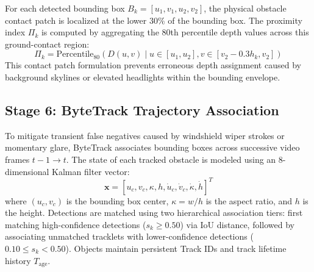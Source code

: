 \documentclass[conference]{IEEEtran}
\begin{document}
For each detected bounding box $B_k = [u_1, v_1, u_2, v_2]$, the physical obstacle contact patch is localized at the lower $30\%$ of the bounding box. The proximity index $\Pi_k$ is computed by aggregating the 80th percentile depth values across this ground-contact region:
\begin{equation}
\Pi_k = \text{Percentile}_{80} \left( D(u, v) \mid u \in [u_1, u_2], v \in [v_2 - 0.3h_k, v_2] \right)
\label{eq:proximity}
\end{equation}
This contact patch formulation prevents erroneous depth assignment caused by background skylines or elevated headlights within the bounding envelope.

\subsection{Stage 6: ByteTrack Trajectory Association}
To mitigate transient false negatives caused by windshield wiper strokes or momentary glare, ByteTrack associates bounding boxes across successive video frames $t-1 \to t$. The state of each tracked obstacle is modeled using an 8-dimensional Kalman filter vector:
\begin{equation}
\mathbf{x} = [u_c, v_c, \kappa, h, \dot{u}_c, \dot{v}_c, \dot{\kappa}, \dot{h}]^T
\label{eq:kalman}
\end{equation}
where $(u_c, v_c)$ is the bounding box center, $\kappa = w/h$ is the aspect ratio, and $h$ is the height. Detections are matched using two hierarchical association tiers: first matching high-confidence detections ($s_k \ge 0.50$) via IoU distance, followed by associating unmatched tracklets with lower-confidence detections ($0.10 \le s_k < 0.50$). Objects maintain persistent Track IDs and track lifetime history $T_{\text{age}}$.
\end{document}
